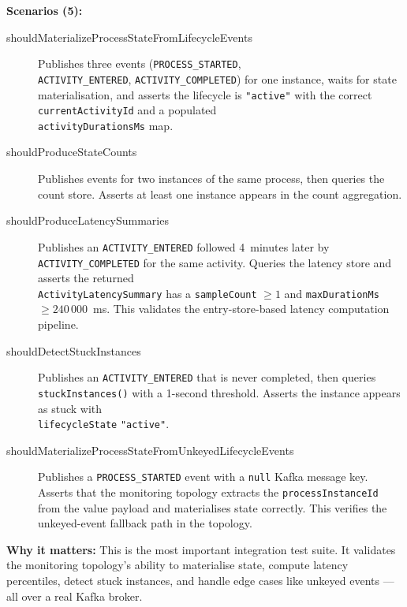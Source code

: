 \textbf{Scenarios (5):}

\begin{description}

\item[shouldMaterializeProcessStateFromLifecycleEvents] Publishes three
events (\texttt{PROCESS\_STARTED}, \\ \texttt{ACTIVITY\_ENTERED},
\texttt{ACTIVITY\_COMPLETED}) for one instance, waits for state
materialisation, and asserts the lifecycle is \texttt{"active"} with the
correct \texttt{currentActivityId} and a populated \\
\texttt{activityDurationsMs} map.

\item[shouldProduceStateCounts] Publishes events for two instances of the
same process, then queries the count store. Asserts at least one instance
appears in the count aggregation.

\item[shouldProduceLatencySummaries] Publishes an
\texttt{ACTIVITY\_ENTERED} followed 4~minutes later by \\
\texttt{ACTIVITY\_COMPLETED} for the same activity. Queries the latency
store and asserts the returned \\ \texttt{ActivityLatencySummary} has a
\texttt{sampleCount} $\ge 1$ and \texttt{maxDurationMs} $\ge 240\,000$~ms.
This validates the entry-store-based latency computation pipeline.

\item[shouldDetectStuckInstances] Publishes an
\texttt{ACTIVITY\_ENTERED} that is never completed, then queries
\texttt{stuckInstances()} with a 1-second threshold. Asserts the instance
appears as stuck with \\ \texttt{lifecycleState} \texttt{"active"}.

\item[shouldMaterializeProcessStateFromUnkeyedLifecycleEvents] Publishes
a \texttt{PROCESS\_STARTED} event with a \texttt{null} Kafka message key.
Asserts that the monitoring topology extracts the
\texttt{processInstanceId} from the value payload and materialises state
correctly. This verifies the unkeyed-event fallback path in the topology.

\end{description}

\textbf{Why it matters:} This is the most important integration test suite.
It validates the monitoring topology's ability to materialise state, compute
latency percentiles, detect stuck instances, and handle edge cases like
unkeyed events --- all over a real Kafka broker.

